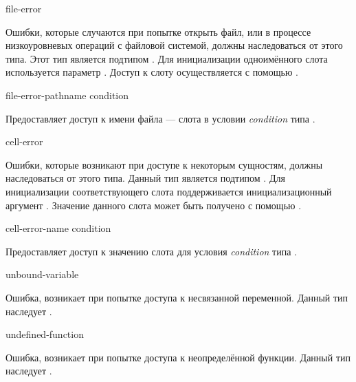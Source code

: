 \begin{defun}[Тип]
file-error

Ошибки, которые случаются при попытке открыть файл, или в процессе
низкоуровневых операций с файловой системой, должны наследоваться от этого
типа. Этот тип является подтипом . Для инициализации одноимённого
слота используется параметр . Доступ к слоту осуществляется с
помощью .
\end{defun}

\begin{defun}[Функция]
file-error-pathname condition

Предоставляет доступ к имени файла --- слота в условии \emph{condition} типа
.
\end{defun}

\begin{defun}[Тип]
cell-error

Ошибки, которые возникают при доступе к некоторым сущностям, должны
наследоваться от этого типа. Данный тип является подтипом . Для
инициализации соответствующего слота поддерживается инициализационный аргумент
. Значение данного слота может быть получено с помощью .
\end{defun}

\begin{defun}[Функция]
cell-error-name condition

Предоставляет доступ к значению слота  для условия
\emph{condition} типа .
\end{defun}

\begin{defun}[Тип]
unbound-variable

Ошибка, возникает при попытке доступа к несвязанной переменной. Данный тип
наследует .
\end{defun}

\begin{defun}[Тип]
undefined-function

Ошибка, возникает при попытке доступа к неопределённой функции. Данный
тип наследует .
\end{defun}

